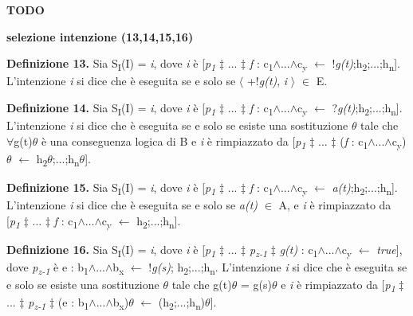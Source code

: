 \bigskip
\textbf{TODO}

\textbf{selezione intenzione (13,14,15,16)}

\smallskip
\textbf{Definizione 13.} Sia S\textsubscript{I}(I) = \textit{i}, dove \textit{i} \`e [\textit{p\textsubscript{1}} $\ddagger$ ... $\ddagger$ \textit{f} : c\textsubscript{1}$\land$...$\land$c\textsubscript{y} $\leftarrow$ !\textit{g(t)};h\textsubscript{2};...;h\textsubscript{n}]. L'intenzione \textit{i} si dice che \`e eseguita  se e solo se $\langle$ +!\textit{g(t)}, \textit{i} $\rangle$ $\in$ E.

\smallskip
\textbf{Definizione 14.} Sia S\textsubscript{I}(I) = \textit{i}, dove \textit{i} \`e [\textit{p\textsubscript{1}} $\ddagger$ ... $\ddagger$ \textit{f} : c\textsubscript{1}$\land$...$\land$c\textsubscript{y} $\leftarrow$ ?\textit{g(t)};h\textsubscript{2};...;h\textsubscript{n}]. L'intenzione \textit{i} si dice che \`e eseguita  se e solo se esiste una sostituzione \textit{$\theta$} tale che $\forall$g(t)\textit{$\theta$} \`e una conseguenza logica di B e \textit{i} \`e rimpiazzato da [\textit{p\textsubscript{1}} $\ddagger$ ... $\ddagger$ (\textit{f} : c\textsubscript{1}$\land$...$\land$c\textsubscript{y})\textit{$\theta$} $\leftarrow$ h\textsubscript{2}\textit{$\theta$};...;h\textsubscript{n}\textit{$\theta$}].

\smallskip
\textbf{Definizione 15.} Sia S\textsubscript{I}(I) = \textit{i}, dove \textit{i} \`e [\textit{p\textsubscript{1}} $\ddagger$ ... $\ddagger$ \textit{f} : c\textsubscript{1}$\land$...$\land$c\textsubscript{y} $\leftarrow$ \textit{a(t)};h\textsubscript{2};...;h\textsubscript{n}]. L'intenzione \textit{i} si dice che \`e eseguita  se e solo se \textit{a(t)} $\in$ A, e \textit{i} \`e rimpiazzato da [\textit{p\textsubscript{1}} $\ddagger$ ... $\ddagger$ \textit{f} : c\textsubscript{1}$\land$...$\land$c\textsubscript{y} $\leftarrow$ h\textsubscript{2};...;h\textsubscript{n}].

\smallskip
\textbf{Definizione 16.} Sia S\textsubscript{I}(I) = \textit{i}, dove \textit{i} \`e [\textit{p\textsubscript{1}} $\ddagger$ ... $\ddagger$ \textit{p\textsubscript{z-1}} $\ddagger$ \textit{g(t)} : c\textsubscript{1}$\land$...$\land$c\textsubscript{y} $\leftarrow$ \textit{true}], dove \textit{p\textsubscript{z-1}} \`e e : b\textsubscript{1}$\land$...$\land$b\textsubscript{x} $\leftarrow$ !\textit{g(s)}; h\textsubscript{2};...;h\textsubscript{n}. L'intenzione \textit{i} si dice che \`e eseguita  se e solo se esiste una sostituzione \textit{$\theta$} tale che g(t)\textit{$\theta$} = g(s)\textit{$\theta$} e \textit{i} \`e rimpiazzato da [\textit{p\textsubscript{1}} $\ddagger$ ... $\ddagger$ \textit{p\textsubscript{z-1}} $\ddagger$ (e : b\textsubscript{1}$\land$...$\land$b\textsubscript{x})\textit{$\theta$} $\leftarrow$ (h\textsubscript{2};...;h\textsubscript{n})\textit{$\theta$}].


